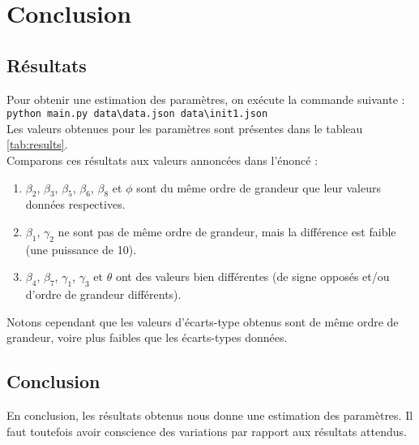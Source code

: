 \section{Conclusion}
\subsection{Résultats}
Pour obtenir une estimation des paramètres, on exécute la commande suivante :  \\
\verb|python main.py data\data.json data\init1.json| \\
Les valeurs obtenues pour les paramètres sont présentes dans le tableau \ref{tab:results}. \\


Comparons ces résultats aux valeurs annoncées dans l'énoncé \cite{winbugs_school} :
\begin{enumerate}
    \item $\beta_{2}$,  $\beta_{3}$,  $\beta_{5}$, $\beta_{6}$, $\beta_{8}$ et $\phi$ sont du même ordre de grandeur que leur valeurs données respectives.
    \item $\beta_{1}$, $\gamma_{2}$ ne sont pas de même ordre de grandeur, mais la différence est faible (une puissance de 10).
    \item $\beta_{4}$, $\beta_{7}$, $\gamma_{1}$, $\gamma_{3}$ et $\theta$ ont des valeurs bien différentes (de signe opposés et/ou d'ordre de grandeur différents).
\end{enumerate}

Notons cependant que les valeurs d'écarts-type obtenus sont de même ordre de grandeur, voire plus faibles que les écarts-types données.
\subsection{Conclusion}

En conclusion, les résultats obtenus nous donne une estimation des paramètres. Il faut toutefois avoir conscience des variations par rapport aux résultats attendus.
